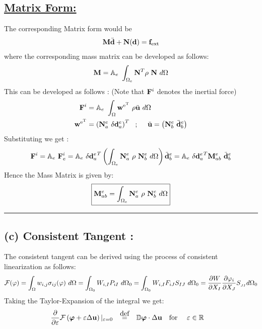 \subsection*{\underline{Matrix Form: }}
The corresponding Matrix form would be
\begin{align*}
{\bf M}\ddot{\bf d}
+
{\bf N}({\bf d})
=
{\bf f}_{\rm ext}
\end{align*}
where the corresponding mass matrix can be developed as follows: 
\begin{align*}
{\bf M}
=
\mathbb{A}_e\ \int_{\Omega_e}
{\bf N}^T \rho \ {\bf N}\ d\Omega
\end{align*}
This can be developed as follows : (Note that ${\bf F}^i$ denotes the inertial force) 
\begin{align*}
{\bf F}^{i}
& = 
\mathbb{A}_e\ 
\int_{\Omega}
{\bf w}^{\rm e^{T}}\ \rho
\ddot{\bf u}\ d\Omega \\
{\bf w}^{\rm e^{T}}
& =
\left(
{\bf N}^e_a\ \delta {\bf d}^e_a
\right)^T \ \ ; \ \ \ \ \ddot{\bf u} = 
\left(
{\bf N}^e_b\ \ddot{\bf d}^e_b
\right)
\end{align*}
Substituting we get : 
\begin{align*}
{\bf F}^i
=
\mathbb{A}_e\ {\bf F}^i_e
=
\mathbb{A}_e
\ 
{\delta {\bf d}^e_a}^T \left(
\int_{\Omega_e}
{\bf N}^e_a\ \rho\ {\bf N}^e_b\ d\Omega \right)\ddot{\bf d}^e_b = \mathbb{A}_e
\ 
{\delta {\bf d}^e_a}^T {\bf M}^e_{ab}\ \ddot{\bf d}^e_b
\end{align*}
Hence the Mass Matrix is given by: 
\begin{align*}
\boxed{{\bf M}^e_{ab}
=
\int_{\Omega_e}
{\bf N}^e_a\ \rho\ {\bf N}^e_b\ d\Omega 
}
\end{align*}\hrule
\newpage\subsection*{(c) Consistent Tangent : }
The consistent tangent can be derived using the process of consistent linearization as follows: 
\begin{align*}
\mathcal{F}(\varphi)
=
\int_{\Omega}
w_{i,j}
\sigma_{ij} ({\bf \varphi})\ d\Omega
=
\int_{\Omega_0}
W_{i,I}P_{iI}\ d\Omega_0
=
\int_{\Omega_0}
W_{i,I}F_{iJ}S_{IJ}\ d\Omega_0
=
\frac{\partial {W}}{\partial {X_I}}\frac{\partial {\varphi_i}}{\partial {X_J}}S_{_{JI}} d\Omega_0
\end{align*}
Taking the Taylor-Expansion of the integral we get: 
\begin{align*}
\del{}{\varepsilon}\mathcal{F}
\left(
\bm\varphi + \varepsilon\Delta {\bf u}
\right)|_{\varepsilon =  0} \ \ \  & \myeq\ \ \  \mathbb{D}\mathcal{\bm\varphi}\cdot \Delta {\bf u} \ \ \ \text{for }\ \ \ \varepsilon \in \mathbb{R}
\end{align*}
